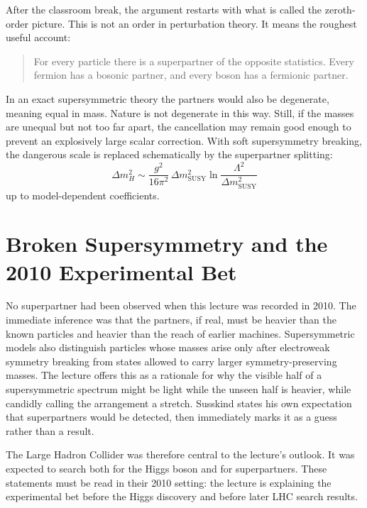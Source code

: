 After the classroom break, the argument restarts with what is called the zeroth-order picture. This is not an order in perturbation theory. It means the roughest useful account:
\begin{quote}
For every particle there is a superpartner of the opposite statistics. Every fermion has a bosonic partner, and every boson has a fermionic partner.
\end{quote}
In an exact supersymmetric theory the partners would also be degenerate, meaning equal in mass. Nature is not degenerate in this way. Still, if the masses are unequal but not too far apart, the cancellation may remain good enough to prevent an explosively large scalar correction. With soft supersymmetry breaking, the dangerous scale is replaced schematically by the superpartner splitting:
\begin{equation}
\Delta m_H^2\sim
\frac{g^2}{16\pi^2}\,\Delta m_{\mathrm{SUSY}}^2
\ln\!\frac{\Lambda^2}{\Delta m_{\mathrm{SUSY}}^2}
\end{equation}
up to model-dependent coefficients.

\section{Broken Supersymmetry and the 2010 Experimental Bet}

No superpartner had been observed when this lecture was recorded in 2010. The immediate inference was that the partners, if real, must be heavier than the known particles and heavier than the reach of earlier machines. Supersymmetric models also distinguish particles whose masses arise only after electroweak symmetry breaking from states allowed to carry larger symmetry-preserving masses. The lecture offers this as a rationale for why the visible half of a supersymmetric spectrum might be light while the unseen half is heavier, while candidly calling the arrangement a stretch. Susskind states his own expectation that superpartners would be detected, then immediately marks it as a guess rather than a result.

The Large Hadron Collider was therefore central to the lecture's outlook. It was expected to search both for the Higgs boson and for superpartners. These statements must be read in their 2010 setting: the lecture is explaining the experimental bet before the Higgs discovery and before later LHC search results.

